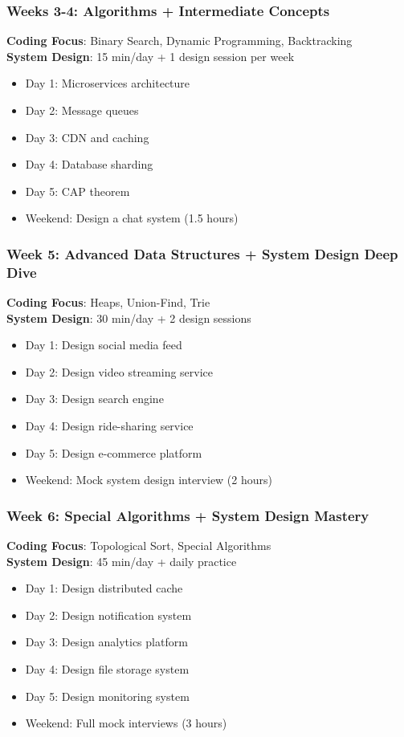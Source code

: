 \documentclass[10pt,a4paper]{article}
\begin{document}
\subsubsection{Weeks 3-4: Algorithms + Intermediate Concepts}
\textbf{Coding Focus}: Binary Search, Dynamic Programming, Backtracking\\
\textbf{System Design}: 15 min/day + 1 design session per week
\begin{itemize}
\item Day 1: Microservices architecture
\item Day 2: Message queues
\item Day 3: CDN and caching
\item Day 4: Database sharding
\item Day 5: CAP theorem
\item Weekend: Design a chat system (1.5 hours)
\end{itemize}

\subsubsection{Week 5: Advanced Data Structures + System Design Deep Dive}
\textbf{Coding Focus}: Heaps, Union-Find, Trie\\
\textbf{System Design}: 30 min/day + 2 design sessions
\begin{itemize}
\item Day 1: Design social media feed
\item Day 2: Design video streaming service
\item Day 3: Design search engine
\item Day 4: Design ride-sharing service
\item Day 5: Design e-commerce platform
\item Weekend: Mock system design interview (2 hours)
\end{itemize}

\subsubsection{Week 6: Special Algorithms + System Design Mastery}
\textbf{Coding Focus}: Topological Sort, Special Algorithms\\
\textbf{System Design}: 45 min/day + daily practice
\begin{itemize}
\item Day 1: Design distributed cache
\item Day 2: Design notification system
\item Day 3: Design analytics platform
\item Day 4: Design file storage system
\item Day 5: Design monitoring system
\item Weekend: Full mock interviews (3 hours)
\end{itemize}
\end{document}
